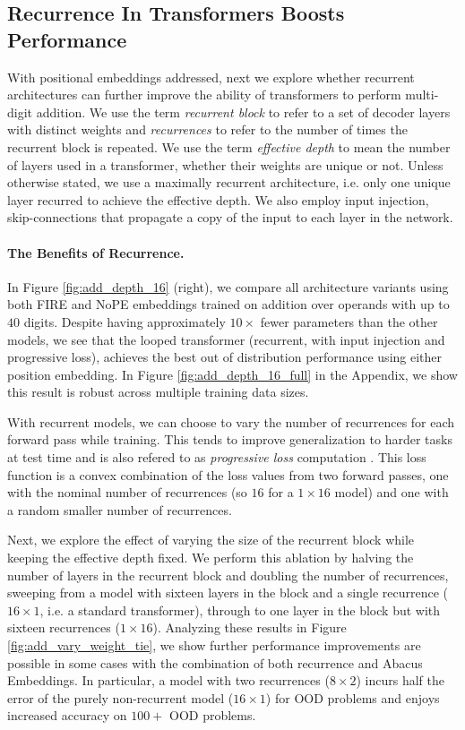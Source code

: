 \documentclass{article}
\begin{document}
\subsection{Recurrence In Transformers Boosts Performance}

With positional embeddings addressed, next we explore whether recurrent architectures can further improve the ability of transformers to perform multi-digit addition.
We use the term \emph{recurrent block} to refer to a set of decoder layers with distinct weights and \emph{recurrences} to refer to the number of times the recurrent block is repeated.
We use the term \emph{effective depth} to mean the number of layers used in a transformer, whether their weights are unique or not.
Unless otherwise stated, we use a maximally recurrent architecture, i.e. only one unique layer recurred to achieve the effective depth.
We also employ input injection, skip-connections that propagate a copy of the input to each layer in the network.

\paragraph{The Benefits of Recurrence.}
In Figure \ref{fig:add_depth_16} (right), we compare all architecture variants using both FIRE and NoPE embeddings trained on addition over operands with up to $40$ digits.
Despite having approximately \(10\times\) fewer parameters than the other models, we see that the looped transformer (recurrent, with input injection and progressive loss), achieves the best out of distribution performance using either position embedding.
In Figure \ref{fig:add_depth_16_full} in the Appendix, we show this result is robust across multiple training data sizes.

With recurrent models, we can choose to vary the number of recurrences for each forward pass while training. This tends to improve generalization to harder tasks at test time and is also refered to as \emph{progressive loss} computation \citep{bansal2022endtoend}. 
This loss function is a convex combination of the loss values from two forward passes, one with the nominal number of recurrences (so \(16\) for a \(1\times16\) model) and one with a random smaller number of recurrences.

Next, we explore the effect of varying the size of the recurrent block while keeping the effective depth fixed.
We perform this ablation by halving the number of layers in the recurrent block and doubling the number of recurrences, sweeping from a model with sixteen layers in the block and a single recurrence (\(16\times1\), i.e. a standard transformer), through to one layer in the block but with sixteen recurrences (\(1\times16\)). 
Analyzing these results in Figure \ref{fig:add_vary_weight_tie}, we show further performance improvements are possible in some cases with the combination of both recurrence and Abacus Embeddings. 
In particular, a model with two recurrences (\(8\times2\)) incurs half the error of the purely non-recurrent model (\(16\times1\)) for OOD problems and enjoys increased accuracy on $100+$ OOD problems.
\end{document}
